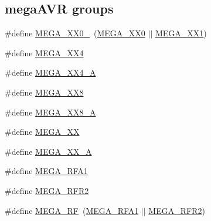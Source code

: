 \subsection*{mega\+A\+VR groups}
\begin{DoxyCompactItemize}
\item 
\#define \mbox{\hyperlink{group__mega__part__macros__group_ga59ba73abcf65d3d398e7d37d78c271fe}{M\+E\+G\+A\+\_\+\+X\+X0\+\_}}~(\mbox{\hyperlink{group__mega__part__macros__group_gad59dc6f3c3dc91c94cd1673448135b83}{M\+E\+G\+A\+\_\+\+X\+X0}} $\vert$$\vert$ \mbox{\hyperlink{group__mega__part__macros__group_ga9ed7e955cff24655d99517f91d9f6392}{M\+E\+G\+A\+\_\+\+X\+X1}})
\item 
\#define \mbox{\hyperlink{group__mega__part__macros__group_gadcf5297df4d3d2f2bb5ccd7d6e3578b6}{M\+E\+G\+A\+\_\+\+X\+X4}}
\item 
\#define \mbox{\hyperlink{group__mega__part__macros__group_gaf7dde20cbd5a8e5d53438e8dfac074a2}{M\+E\+G\+A\+\_\+\+X\+X4\+\_\+A}}
\item 
\#define \mbox{\hyperlink{group__mega__part__macros__group_ga47583caa82990781cd23a8495710ef31}{M\+E\+G\+A\+\_\+\+X\+X8}}
\item 
\#define \mbox{\hyperlink{group__mega__part__macros__group_gadb4a50447f658e564b640ca248e85b51}{M\+E\+G\+A\+\_\+\+X\+X8\+\_\+A}}
\item 
\#define \mbox{\hyperlink{group__mega__part__macros__group_gabdf992a84b61d19055315a473c2e0f20}{M\+E\+G\+A\+\_\+\+XX}}
\item 
\#define \mbox{\hyperlink{group__mega__part__macros__group_ga2b23bf35c1439ec05ddac769a8d8d1f8}{M\+E\+G\+A\+\_\+\+X\+X\+\_\+A}}
\item 
\#define \mbox{\hyperlink{group__mega__part__macros__group_gaa301ab9851fc885a2d07f5df47d0a893}{M\+E\+G\+A\+\_\+\+R\+F\+A1}}
\item 
\#define \mbox{\hyperlink{group__mega__part__macros__group_gaa5278eedfdfffaeb7c2c49aff7c2eb97}{M\+E\+G\+A\+\_\+\+R\+F\+R2}}
\item 
\#define \mbox{\hyperlink{group__mega__part__macros__group_ga1d762b037d9532cdfbc28404113aa480}{M\+E\+G\+A\+\_\+\+RF}}~(\mbox{\hyperlink{group__mega__part__macros__group_gaa301ab9851fc885a2d07f5df47d0a893}{M\+E\+G\+A\+\_\+\+R\+F\+A1}} $\vert$$\vert$ \mbox{\hyperlink{group__mega__part__macros__group_gaa5278eedfdfffaeb7c2c49aff7c2eb97}{M\+E\+G\+A\+\_\+\+R\+F\+R2}})
\end{DoxyCompactItemize}

